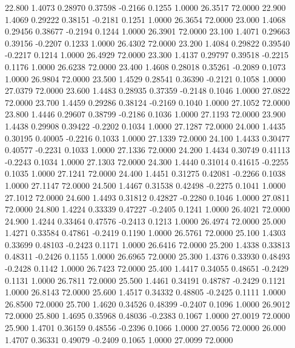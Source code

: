   22.800   1.4073   0.28970   0.37598  -0.2166   0.1255   1.0000  26.3517  72.0000
  22.900   1.4069   0.29222   0.38151  -0.2181   0.1251   1.0000  26.3654  72.0000
  23.000   1.4068   0.29456   0.38677  -0.2194   0.1244   1.0000  26.3901  72.0000
  23.100   1.4071   0.29663   0.39156  -0.2207   0.1233   1.0000  26.4302  72.0000
  23.200   1.4084   0.29822   0.39540  -0.2217   0.1214   1.0000  26.4929  72.0000
  23.300   1.4137   0.29797   0.39518  -0.2215   0.1176   1.0000  26.6238  72.0000
  23.400   1.4608   0.28018   0.35261  -0.2089   0.1073   1.0000  26.9804  72.0000
  23.500   1.4529   0.28541   0.36390  -0.2121   0.1058   1.0000  27.0379  72.0000
  23.600   1.4483   0.28935   0.37359  -0.2148   0.1046   1.0000  27.0822  72.0000
  23.700   1.4459   0.29286   0.38124  -0.2169   0.1040   1.0000  27.1052  72.0000
  23.800   1.4446   0.29607   0.38799  -0.2186   0.1036   1.0000  27.1193  72.0000
  23.900   1.4438   0.29908   0.39422  -0.2202   0.1034   1.0000  27.1287  72.0000
  24.000   1.4435   0.30195   0.40005  -0.2216   0.1033   1.0000  27.1339  72.0000
  24.100   1.4433   0.30477   0.40577  -0.2231   0.1033   1.0000  27.1336  72.0000
  24.200   1.4434   0.30749   0.41113  -0.2243   0.1034   1.0000  27.1303  72.0000
  24.300   1.4440   0.31014   0.41615  -0.2255   0.1035   1.0000  27.1241  72.0000
  24.400   1.4451   0.31275   0.42081  -0.2266   0.1038   1.0000  27.1147  72.0000
  24.500   1.4467   0.31538   0.42498  -0.2275   0.1041   1.0000  27.1012  72.0000
  24.600   1.4493   0.31812   0.42827  -0.2280   0.1046   1.0000  27.0811  72.0000
  24.800   1.4224   0.33339   0.47227  -0.2405   0.1241   1.0000  26.4021  72.0000
  24.900   1.4244   0.33464   0.47576  -0.2413   0.1213   1.0000  26.4974  72.0000
  25.000   1.4271   0.33584   0.47861  -0.2419   0.1190   1.0000  26.5761  72.0000
  25.100   1.4303   0.33699   0.48103  -0.2423   0.1171   1.0000  26.6416  72.0000
  25.200   1.4338   0.33813   0.48311  -0.2426   0.1155   1.0000  26.6965  72.0000
  25.300   1.4376   0.33930   0.48493  -0.2428   0.1142   1.0000  26.7423  72.0000
  25.400   1.4417   0.34055   0.48651  -0.2429   0.1131   1.0000  26.7811  72.0000
  25.500   1.4461   0.34191   0.48787  -0.2429   0.1121   1.0000  26.8143  72.0000
  25.600   1.4517   0.34332   0.48805  -0.2425   0.1111   1.0000  26.8500  72.0000
  25.700   1.4620   0.34526   0.48399  -0.2407   0.1096   1.0000  26.9012  72.0000
  25.800   1.4695   0.35968   0.48036  -0.2383   0.1067   1.0000  27.0019  72.0000
  25.900   1.4701   0.36159   0.48556  -0.2396   0.1066   1.0000  27.0056  72.0000
  26.000   1.4707   0.36331   0.49079  -0.2409   0.1065   1.0000  27.0099  72.0000
